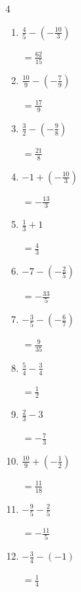 \begin{multicols}{4}
\begin{enumerate}
  \item $\displaystyle \frac{4}{5} - \left(-\frac{10}{3}\right)$

        $\displaystyle =\frac{62}{15}$

  \item $\displaystyle \frac{10}{9} - \left(-\frac{7}{9}\right)$

        $\displaystyle =\frac{17}{9}$

  \item $\displaystyle \frac{3}{2} - \left(-\frac{9}{8}\right)$

        $\displaystyle =\frac{21}{8}$

  \item $\displaystyle -1 + \left(-\frac{10}{3}\right)$

        $\displaystyle =-\frac{13}{3}$

  \item $\displaystyle \frac{1}{3} + 1$

        $\displaystyle =\frac{4}{3}$

  \item $\displaystyle -7 - \left(-\frac{2}{5}\right)$

        $\displaystyle =-\frac{33}{5}$

  \item $\displaystyle -\frac{3}{5} - \left(-\frac{6}{7}\right)$

        $\displaystyle =\frac{9}{35}$

\columnbreak %

  \item $\displaystyle \frac{5}{4} - \frac{3}{4}$

        $\displaystyle =\frac{1}{2}$

  \item $\displaystyle \frac{2}{3} - 3$

        $\displaystyle =-\frac{7}{3}$

  \item $\displaystyle \frac{10}{9} + \left(-\frac{1}{2}\right)$

        $\displaystyle =\frac{11}{18}$

  \item $\displaystyle -\frac{9}{5} - \frac{2}{5}$

        $\displaystyle =-\frac{11}{5}$

  \item $\displaystyle -\frac{3}{4} - \left(-1\right)$

        $\displaystyle =\frac{1}{4}$


\end{enumerate}
\end{multicols}

